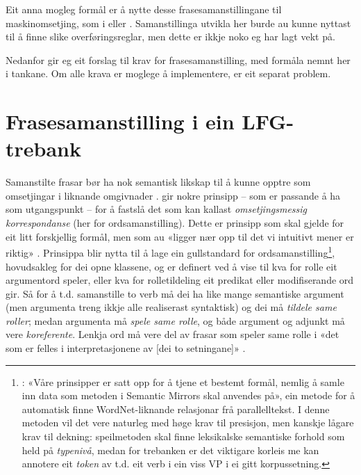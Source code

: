 \documentclass[12pt,a4paper,oneside,draft]{report}
\begin{document}
Eit anna mogleg formål er å nytte desse frasesamanstillingane til
 maskinomsetjing, som i \citet{riezler2006gmt} eller
 \citet{graham2010dsl,graham2009fts}.  Samanstillinga utvikla her
 burde au kunne nyttast til å finne slike overføringsreglar, men dette
 er ikkje noko eg har lagt vekt på.

Nedanfor gir eg eit forslag til krav for frasesamanstilling, med
 formåla nemnt her i tankane. Om alle krava er moglege å implementere,
 er eit separat problem.

\section{Frasesamanstilling i ein LFG-trebank}
\label{sec-3.3}


Samanstilte frasar bør ha nok semantisk likskap til å kunne opptre som
omsetjingar i liknande omgivnader
\citep[s.~74]{dyvik2009lmp}. \citet{thunes2003eal} gir nokre prinsipp
-- som er passande å ha som utgangspunkt -- for å fastslå det som kan
kallast \emph{omsetjingsmessig korrespondanse} (her for
ordsamanstilling). Dette er prinsipp som skal gjelde for eit litt
forskjellig formål, men som au «ligger nær opp til det vi intuitivt
mener er riktig» \citep[s.~2]{thunes2003eal}. Prinsippa blir nytta til
å lage ein gullstandard for ordsamanstilling\footnote{\cite[s.~2]{thunes2003eal}: «Våre prinsipper er satt
       opp for å tjene et bestemt formål, nemlig å samle inn data som
       metoden i Semantic Mirrors skal anvendes på», ein metode for å
       automatisk finne WordNet-liknande relasjonar frå
       parallelltekst. I denne metoden vil det vere naturleg med høge
       krav til presisjon, men kanskje lågare krav til dekning:
       speilmetoden skal finne leksikalske semantiske forhold som held
       på \emph{typenivå}, medan for trebanken er det viktigare korleis me
       kan annotere eit \emph{token} av t.d. eit verb i ein viss VP i ei
       gitt korpussetning. },
hovudsakleg for dei opne klassene, og er definert ved å vise til kva
for rolle eit argumentord speler, eller kva for rolletildeling eit
predikat eller modifiserande ord gir. Så for å t.d. samanstille to
verb må dei ha like mange semantiske argument (men argumenta treng
ikkje alle realiserast syntaktisk) og dei må \emph{tildele same roller};
medan argumenta må \emph{spele same rolle}, og både argument og adjunkt må
vere \emph{koreferente}. Lenkja ord må vere del av frasar som speler same
rolle i «det som er felles i interpretasjonene av [dei to setningane]»
\citep[s.~3]{thunes2003eal}.
\end{document}
